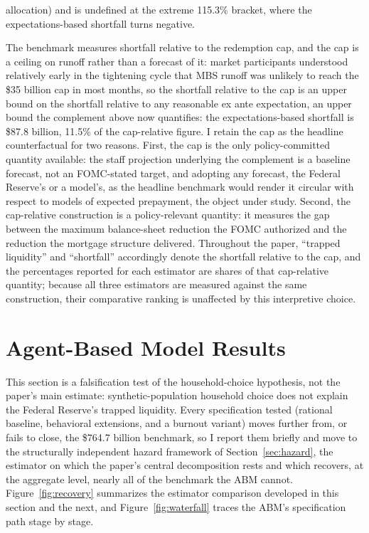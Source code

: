 \documentclass[12pt]{article}
\begin{document}
allocation) and is undefined at the extreme 115.3\% bracket, where the expectations-based shortfall turns negative.

The benchmark measures shortfall relative to the redemption cap, and the cap is a ceiling on runoff rather than a forecast of it: market participants understood relatively early in the tightening cycle that MBS runoff was unlikely to reach the \$35 billion cap in most months, so the shortfall relative to the cap is an upper bound on the shortfall relative to any reasonable ex ante expectation, an upper bound the complement above now quantifies: the expectations-based shortfall is \$87.8 billion, 11.5\% of the cap-relative figure. I retain the cap as the headline counterfactual for two reasons. First, the cap is the only policy-committed quantity available: the staff projection underlying the complement is a baseline forecast, not an FOMC-stated target, and adopting any forecast, the Federal Reserve's or a model's, as the headline benchmark would render it circular with respect to models of expected prepayment, the object under study. Second, the cap-relative construction is a policy-relevant quantity: it measures the gap between the maximum balance-sheet reduction the FOMC authorized and the reduction the mortgage structure delivered. Throughout the paper, ``trapped liquidity'' and ``shortfall'' accordingly denote the shortfall relative to the cap, and the percentages reported for each estimator are shares of that cap-relative quantity; because all three estimators are measured against the same construction, their comparative ranking is unaffected by this interpretive choice.

\section{Agent-Based Model Results}\label{sec:abm}

This section is a falsification test of the household-choice hypothesis, not the paper's main estimate: synthetic-population household choice does not explain the Federal Reserve's trapped liquidity. Every specification tested (rational baseline, behavioral extensions, and a burnout variant) moves further from, or fails to close, the \$764.7 billion benchmark, so I report them briefly and move to the structurally independent hazard framework of Section~\ref{sec:hazard}, the estimator on which the paper's central decomposition rests and which recovers, at the aggregate level, nearly all of the benchmark the ABM cannot. Figure~\ref{fig:recovery} summarizes the estimator comparison developed in this section and the next, and Figure~\ref{fig:waterfall} traces the ABM's specification path stage by stage.
\end{document}
